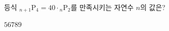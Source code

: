 등식 ${}_{n+1}\mathrm{P}_4=40\cdot{}_n\mathrm{P}_2$를 만족시키는 자연수 $n$의 값은?
\begin{choices32}{$5$}{$6$}{$7$}{$8$}{$9$}\end{choices32}

